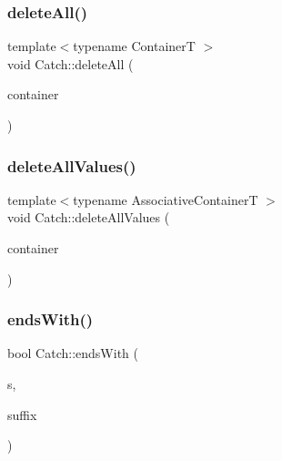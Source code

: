 \mbox{\label{namespace_catch_aadf9786550a462740ec355f8219863a9}} 
\subsubsection{\texorpdfstring{delete\+All()}{deleteAll()}}
{\footnotesize\ttfamily template$<$typename ContainerT $>$ \\
void Catch\+::delete\+All (\begin{DoxyParamCaption}\item[{ContainerT \&}]{container }\end{DoxyParamCaption})\hspace{0.3cm}{\ttfamily [inline]}}

\mbox{\label{namespace_catch_af2fcec1d4bd984fe19ff8b9a432c36a8}} 
\subsubsection{\texorpdfstring{delete\+All\+Values()}{deleteAllValues()}}
{\footnotesize\ttfamily template$<$typename Associative\+ContainerT $>$ \\
void Catch\+::delete\+All\+Values (\begin{DoxyParamCaption}\item[{Associative\+ContainerT \&}]{container }\end{DoxyParamCaption})\hspace{0.3cm}{\ttfamily [inline]}}

\mbox{\label{namespace_catch_ada025504f627feaf9ac68ca391515dff}} 
\subsubsection{\texorpdfstring{ends\+With()}{endsWith()}\hspace{0.1cm}{\footnotesize\ttfamily [1/2]}}
{\footnotesize\ttfamily bool Catch\+::ends\+With (\begin{DoxyParamCaption}\item[{std\+::string const \&}]{s,  }\item[{std\+::string const \&}]{suffix }\end{DoxyParamCaption})}

